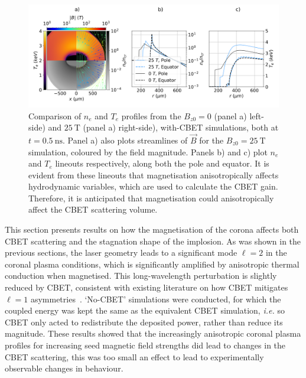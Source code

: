 \begin{figure}[t!]
    \includegraphics[width=\linewidth]{Results2/Images/ne_te_Bstream_comp_alt050.png}
    \centering
    \caption{Comparison of $n_e$ and $T_e$ profiles from the $B_{z0}=0$ (panel a) left-side) and $25\ \text{T}$ (panel a) right-side), with-\ac{CBET} simulations, both at $t=0.5\ \text{ns}$.
    Panel a) also plots streamlines of $\vec{B}$ for the $B_{z0}=25\ \text{T}$ simulation, coloured by the field magnitude.
    Panels b) and c) plot $n_e$ and $T_e$ lineouts respectively, along both the pole and equator.
    It is evident from these lineouts that magnetisation anisotropically affects hydrodynamic variables, which are used to calculate the \ac{CBET} gain.
    Therefore, it is anticipated that magnetisation could anisotropically affect the \ac{CBET} scattering volume.}%
    \label{fig:Res2_ne_te_Bstream_comp_alt050}
\end{figure}

This section presents results on how the magnetisation of the corona affects both \ac{CBET} scattering and the stagnation shape of the implosion.
As was shown in the previous sections, the laser geometry leads to a significant mode $\ell=2$ in the coronal plasma conditions, which is significantly amplified by anisotropic thermal conduction when magnetised.
This long-wavelength perturbation is slightly reduced by \ac{CBET}, consistent with existing literature on how \ac{CBET} mitigates $\ell=1$ asymmetries~\cite{colaitis_inverse_2021}.
`No-\ac{CBET}' simulations were conducted, for which the coupled energy was kept the same as the equivalent \ac{CBET} simulation, \textit{i.e.} so \ac{CBET} only acted to redistribute the deposited power, rather than reduce its magnitude.
These results showed that the increasingly anisotropic coronal plasma profiles for increasing seed magnetic field strengths did lead to changes in the \ac{CBET} scattering, this was too small an effect to lead to experimentally observable changes in behaviour.

